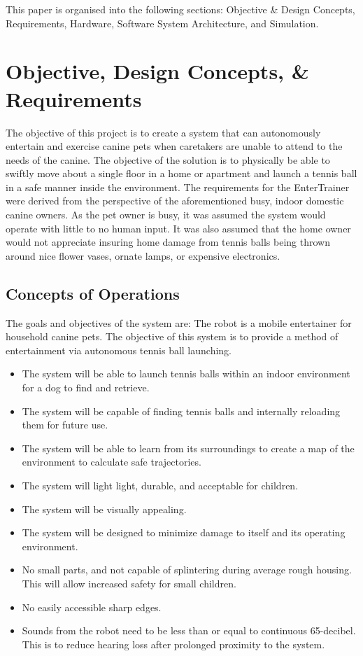 \documentclass[11pt]{article}
\begin{document}
This paper is organised into the following sections: Objective \& Design Concepts, Requirements, Hardware, Software System Architecture, and Simulation.

\section{Objective, Design Concepts, \& Requirements}
The objective of this project is to create a system that can autonomously entertain and exercise canine pets when caretakers are unable to attend to the needs of the canine. 
The objective of the solution is to physically be able to swiftly move about a single floor in a home or apartment and launch a tennis ball in a safe manner inside the environment.
The requirements for the EnterTrainer were derived from the perspective of the aforementioned busy, indoor domestic canine owners. As the pet owner is busy, it was assumed the system would operate with little to no human input. It was also assumed that the home owner would not appreciate insuring home damage from tennis balls being thrown around nice flower vases, ornate lamps, or expensive electronics.   


\subsection{Concepts of Operations}
The goals and objectives of the system are:
The robot is a mobile entertainer for household canine pets. The objective of this system is to provide a method of entertainment via autonomous tennis ball launching.
\begin{itemize}
	\item The system will be able to launch tennis balls within an indoor environment for a dog to find and retrieve. 
	\item The system will be capable of finding tennis balls and internally reloading them for future use.
	\item The system will be able to learn from its surroundings to create a map of the environment to calculate safe trajectories.
	\item The system will light light, durable, and acceptable for children.
	\item The system will be visually appealing.
	\item The system will be designed to minimize damage to itself and its operating environment. 
	\item No small parts, and not capable of splintering during average rough housing.  This will allow increased safety for small children.
	\item No easily accessible sharp edges.
	\item Sounds from the robot need to be less than or equal to continuous 65-decibel. This is to reduce hearing loss after prolonged proximity to the system. 
\end{itemize}  
\end{document}
